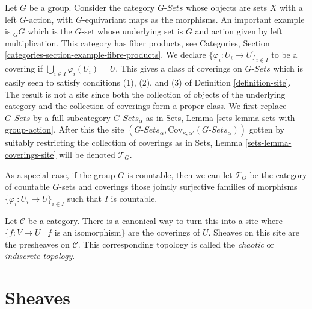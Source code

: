 \begin{example}
\label{example-site-on-group}
Let $G$ be a group. Consider the category $G\textit{-Sets}$
whose objects are sets $X$ with a left $G$-action, with
$G$-equivariant maps as the morphisms. An important example
is ${}_GG$ which is the $G$-set whose underlying set is $G$ and
action given by left multiplication. This category has
fiber products, see Categories, Section
\ref{categories-section-example-fibre-products}.
We declare $\{\varphi_i : U_i \to U\}_{i\in I}$ to be
a covering if $\bigcup_{i\in I} \varphi_i(U_i) = U$.
This gives a class of coverings on $G\textit{-Sets}$
which is easily seen to satisfy conditions (1), (2), and (3)
of Definition \ref{definition-site}. The result is not a
site since both the collection of objects of the underlying category and
the collection of coverings form a proper class.
We first replace $G\textit{-Sets}$ by a
full subcategory $G\textit{-Sets}_\alpha$ as in Sets,
Lemma \ref{sets-lemma-sets-with-group-action}.
After this the site
$(G\textit{-Sets}_\alpha,
\text{Cov}_{\kappa, \alpha'}(G\textit{-Sets}_\alpha))$
gotten by suitably restricting the collection of coverings
as in Sets, Lemma \ref{sets-lemma-coverings-site} will be
denoted $\mathcal{T}_G$.

\medskip\noindent
As a special case, if the group $G$ is countable, then we can let
$\mathcal{T}_G$ be the category of countable $G$-sets and coverings
those jointly surjective families of morphisms
$\{\varphi_i : U_i \to U\}_{i \in I}$ such that $I$ is countable.
\end{example}

\begin{example}
\label{example-indiscrete}
Let $\mathcal{C}$ be a category. There is a canonical way to turn this
into a site where $\{f : V \to U \mid f\text{ is an isomorphism}\}$
are the coverings of $U$.
Sheaves on this site are the presheaves on $\mathcal{C}$.
This corresponding topology is called the {\it chaotic} or
{\it indiscrete topology}.
\end{example}















\section{Sheaves}
\label{section-sheaves}


